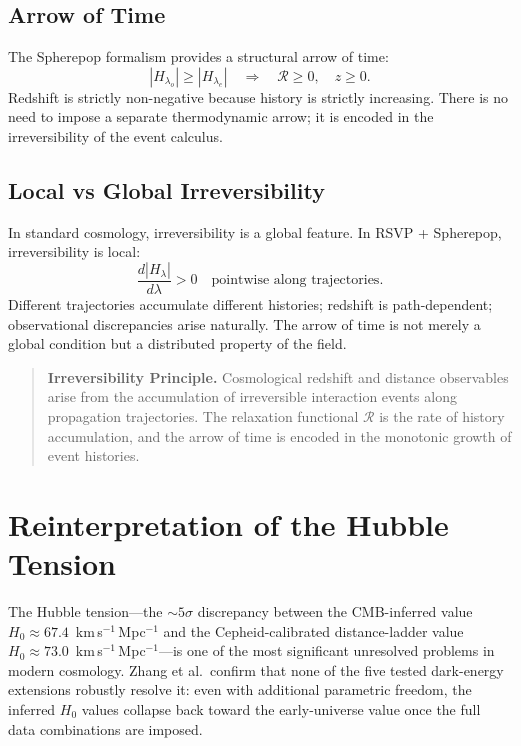 \documentclass[12pt,a4paper]{article}
\theoremstyle{remark}
\newcommand{\Rcal}{\mathcal{R}}
\begin{document}
\subsection{Arrow of Time}

The Spherepop formalism provides a structural arrow of time:
\begin{equation}
|H_{\lambda_o}| \ge |H_{\lambda_e}| \quad\Longrightarrow\quad \Rcal \ge 0, \quad z \ge 0.
\end{equation}
Redshift is strictly non-negative because history is strictly increasing. There is no need to impose a separate thermodynamic arrow; it is encoded in the irreversibility of the event calculus.

\subsection{Local vs Global Irreversibility}

In standard cosmology, irreversibility is a global feature. In RSVP + Spherepop, irreversibility is local:
\begin{equation}
\frac{d|H_\lambda|}{d\lambda} > 0 \quad\text{pointwise along trajectories.}
\end{equation}
Different trajectories accumulate different histories; redshift is path-dependent; observational discrepancies arise naturally. The arrow of time is not merely a global condition but a distributed property of the field.

\begin{quote}
\textbf{Irreversibility Principle.} Cosmological redshift and distance observables arise from the accumulation of irreversible interaction events along propagation trajectories. The relaxation functional $\Rcal$ is the rate of history accumulation, and the arrow of time is encoded in the monotonic growth of event histories.
\end{quote}

\section{Reinterpretation of the Hubble Tension}
\label{sec:hubble}

The Hubble tension---the $\sim 5\sigma$ discrepancy between the CMB-inferred value $H_0 \approx 67.4$~km\,s$^{-1}$\,Mpc$^{-1}$ and the Cepheid-calibrated distance-ladder value $H_0 \approx 73.0$~km\,s$^{-1}$\,Mpc$^{-1}$---is one of the most significant unresolved problems in modern cosmology. Zhang et al.\ confirm that none of the five tested dark-energy extensions robustly resolve it: even with additional parametric freedom, the inferred $H_0$ values collapse back toward the early-universe value once the full data combinations are imposed.
\end{document}
